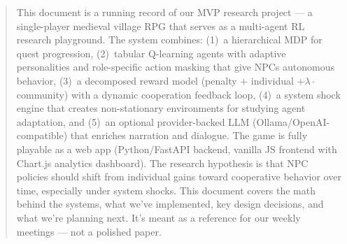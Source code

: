 \begin{abstract}
This document is a running record of our MVP research project --- a single-player medieval village RPG that serves as a multi-agent RL research playground. The system combines: (1)~a hierarchical MDP for quest progression, (2)~tabular Q-learning agents with adaptive personalities and role-specific action masking that give NPCs autonomous behavior, (3)~a decomposed reward model (penalty $+$ individual $+ \lambda \cdot$ community) with a dynamic cooperation feedback loop, (4)~a system shock engine that creates non-stationary environments for studying agent adaptation, and (5)~an optional provider-backed LLM (Ollama/OpenAI-compatible) that enriches narration and dialogue. The game is fully playable as a web app (Python/FastAPI backend, vanilla JS frontend with Chart.js analytics dashboard). The research hypothesis is that NPC policies should shift from individual gains toward cooperative behavior over time, especially under system shocks. This document covers the math behind the systems, what we've implemented, key design decisions, and what we're planning next. It's meant as a reference for our weekly meetings --- not a polished paper.
\end{abstract}
